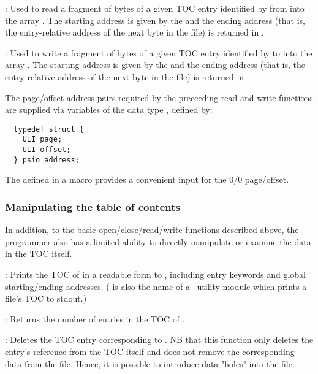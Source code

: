 : Used to read a fragment of
 bytes of a given TOC entry identified by  from
 into the array . The starting address is
given by the  and the ending address (that is, the
entry-relative address of the next byte in the file) is returned in
.

: Used to write a fragment of
 bytes of a given TOC entry identified by  to
 into the array . The starting address is
given by the  and the ending address (that is, the
entry-relative address of the next byte in the file) is returned in
.

The page/offset address pairs required by the preceeding read and
write functions are supplied via variables of the data type
, defined by:
\begin{verbatim}
  typedef struct {
    ULI page;
    ULI offset;
  } psio_address;
\end{verbatim}
The  defined in a macro provides a convenient input
for the 0/0 page/offset.

\subsubsection{Manipulating the table of contents}
In addition, to the basic open/close/read/write functions described above,
the programmer also has a limited ability to directly manipulate or examine
the data in the TOC itself.

: Prints the TOC of
 in a readable form to , including entry
keywords and global starting/ending addresses.  ( is
also the name of a \PSIthree\ utility module which prints a file's TOC to
stdout.)

: Returns the number
of entries in the TOC of .

: Deletes the TOC entry
corresponding to . NB that this function only deletes the
entry's reference from the TOC itself and does not remove the
corresponding data from the file. Hence, it is possible to introduce
data "holes" into the file.

